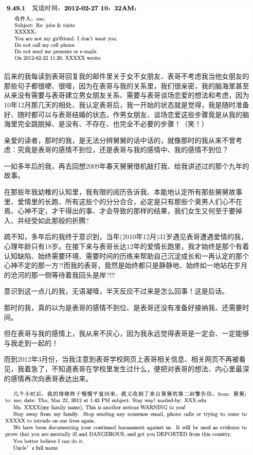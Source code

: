 \documentclass[9pt, b5paper]{article}
\begin{document}
\begin{center}
\includegraphics[width=.9\linewidth]{./pic/p1p104-1.png}
\end{center}

后来的我每读到表哥回复我的邮件里关于女不女朋友、表哥不考虑我当他女朋友的那些句子都很哽、很噎，因为在表哥与我的关系里，我们很亲密，我的脑海里甚至从来没有需要与表哥建立男女朋友关系、需要与表哥谈场恋爱的想法和考虑，因为10年12月那几天的相处、我认定表哥后，我一开始的状态就是觉得，我是随时准备好、随时都可以与表哥结婚的状态，作男女朋友、谈场恋爱这些步骤竟是从我的脑海里完全跳脱掉、是没有、不存在、也完全不必要的步骤！（笑！）

亲爱的读者，那时的我，是无法分辨舅舅的话中话的，就像那时的我从来不曾考虑：究竟是表哥的感情不到位，还是表哥与我的感情中、我的感情不到位？

一如多年后的我，再去回想2009年春天舅舅借机敲打我、给我讲述过的那个九年的故事。

在那些年我幼稚的认知里，我有限的阅历告诉我、本能地认定所有那些舅舅故事里、爱情里的长跑、所有这些个的分分合合，必定是只有那些个臭男人们心不在焉、心神不定，才干得出的事、才会导致的那样的结果，我们女生又何至于要掉入、并经受如此那般的折腾?

疏不知，多年后的我终于意识到，当年(2010年12月)31岁遇见表哥遭遇爱情的我，心理年龄只有18岁。在接下来与表哥长达12年的爱情长跑里，我才始终是那个有着认知缺陷、始终需要环境、需要时间的历练来帮助自己沉淀成长和一再认定的那个心神不定的那一方?!而我的表哥，竟然是始终都只是静静地、始终如一地站在岁月的沧河的那一侧等待着我回头是岸?!!!

意识到这一点儿的我，无语凝噎，半天反应不过来是怎么回事！这是后话。

那时的我，真的以为是表哥的感情不到位、是表哥还没有准备好接纳我、还需要时间。

但在表哥与我的感情上，我从来不灰心，因为我永远觉得表哥是一定会、一定能够与我走到一起的！

而到2012年3月份，当我注意到表哥学校网页上表哥相关信息、相关网页不再被看见，我着急了，不知道表哥在学校里发生过什么，便把对表哥的想法、内心里最深的感情再次向表哥表达出来。

\begin{center}
\includegraphics[width=.9\linewidth]{./pic/p1p117-2.png}
\end{center}
\end{document}

